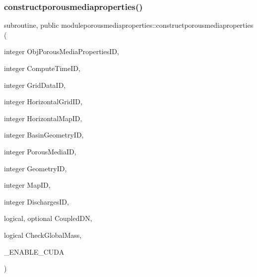 \subsubsection{\texorpdfstring{constructporousmediaproperties()}{constructporousmediaproperties()}}
{\footnotesize\ttfamily subroutine, public moduleporousmediaproperties\+::constructporousmediaproperties (\begin{DoxyParamCaption}\item[{integer}]{Obj\+Porous\+Media\+Properties\+ID,  }\item[{integer}]{Compute\+Time\+ID,  }\item[{integer}]{Grid\+Data\+ID,  }\item[{integer}]{Horizontal\+Grid\+ID,  }\item[{integer}]{Horizontal\+Map\+ID,  }\item[{integer}]{Basin\+Geometry\+ID,  }\item[{integer}]{Porous\+Media\+ID,  }\item[{integer}]{Geometry\+ID,  }\item[{integer}]{Map\+ID,  }\item[{integer}]{Discharges\+ID,  }\item[{logical, optional}]{Coupled\+DN,  }\item[{logical}]{Check\+Global\+Mass,  }\item[{}]{\+\_\+\+E\+N\+A\+B\+L\+E\+\_\+\+C\+U\+DA }\end{DoxyParamCaption})}


